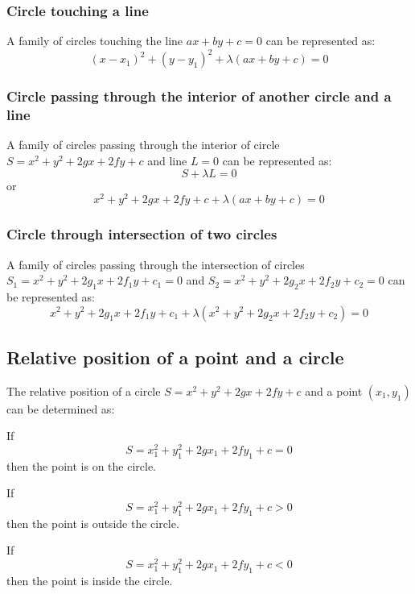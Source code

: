 \documentclass{article}
\begin{document}
\subsubsection{Circle touching a line}
A family of circles touching the line \(ax+by+c = 0\) can be represented as:
\[
(x-x_1)^2 + (y-y_1)^2 + \lambda(ax+by+c) = 0
\]

\subsubsection{Circle passing through the interior of another circle and a line}
A family of circles passing through the interior of circle \(S = x^2+y^2+2gx+2fy+c\) and line \(L = 0\) can be represented as:
\[
S + \lambda L = 0
\]
or
\[
x^2+y^2+2gx+2fy+c+\lambda(ax+by+c)=0
\]

\subsubsection{Circle through intersection of two circles}
A family of circles passing through the intersection of circles \(S_1=x^2+y^2+2g_1x+2f_1y+c_1=0\) and \(S_2=x^2+y^2+2g_2x+2f_2y+c_2=0\) can be represented as:
\[
x^2+y^2+2g_1x+2f_1y+c_1+\lambda(x^2+y^2+2g_2x+2f_2y+c_2)=0
\]

\subsection{Relative position of a point and a circle}
The relative position of a circle \(S = x^2+y^2+2gx+2fy+c\) and a point \((x_1, y_1)\) can be determined as:

If 
\[
S = x_1^2+y_1^2+2gx_1+2fy_1+c = 0
\]
then the point is on the circle.

If 
\[
S = x_1^2+y_1^2+2gx_1+2fy_1+c > 0
\]
then the point is outside the circle.

If 
\[
S = x_1^2+y_1^2+2gx_1+2fy_1+c < 0
\]
then the point is inside the circle.
\end{document}
